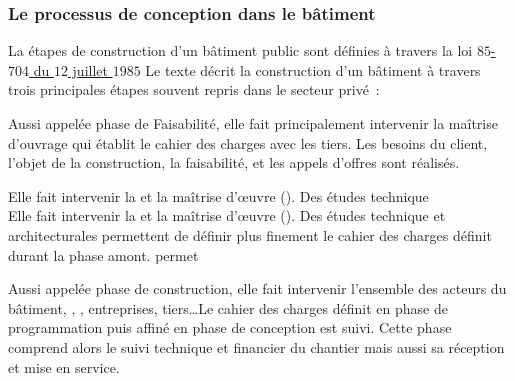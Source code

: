 \subsubsection{Le processus de conception dans le bâtiment} %
\label{ssub:le_processus_de_conception_dans_le_batiment}
La étapes de construction d’un bâtiment public sont définies à travers la loi
\href{https://www.legifrance.gouv.fr/affichTexte.do?cidTexte=JORFTEXT000000693683}{$85$-$704$ du $12$ juillet $1985$}
Le texte décrit la construction d’un bâtiment à travers trois principales étapes
souvent repris dans le secteur privé~:
\begin{description}[align=left]
    \item [Programmation]
          Aussi appelée phase de Faisabilité, elle fait principalement intervenir la
          maîtrise d’ouvrage qui établit le cahier des charges avec les tiers. Les besoins
          du client, l’objet de la construction, la faisabilité, et les appels d’offres
          sont réalisés.
    \item [Conception]
          Elle fait intervenir la  et la maîtrise d’œuvre (). Des études technique \\
          Elle fait intervenir la  et la maîtrise d’œuvre (). Des études technique
          et architecturales permettent de définir plus finement le cahier des charges
          définit durant la phase amont.
          permet
    \item [Réalisation]
          Aussi appelée phase de construction, elle fait intervenir l’ensemble des acteurs
          du bâtiment, , , entreprises, tiers\dots Le cahier des charges définit
          en phase de programmation puis affiné en phase de conception est suivi. Cette
          phase comprend alors le suivi technique et financier du chantier mais aussi sa
          réception et mise en service.
\end{description}

